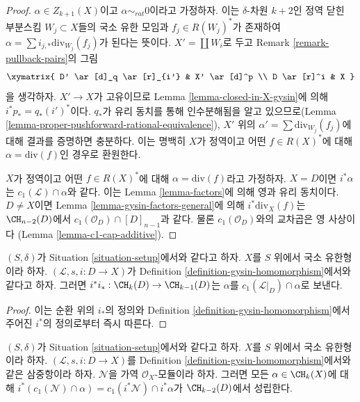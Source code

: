 \begin{proof}
$\alpha \in Z_{k + 1}(X)$이고 $\alpha \sim_{rat} 0$이라고 가정하자.
이는 $\delta$-차원 $k + 2$인 정역 닫힌 부분스킴
$W_j \subset X$들의 국소 유한 모임과 $f_j \in R(W_j)^*$가 존재하여
$\alpha = \sum i_{j, *}\text{div}_{W_j}(f_j)$가 된다는 뜻이다.
$X' = \coprod W_i$로 두고 Remark \ref{remark-pullback-pairs}의 그림
$$
\xymatrix{
D' \ar[d]_q \ar[r]_{i'} & X' \ar[d]^p \\
D \ar[r]^i & X
}
$$
을 생각하자. $X' \to X$가 고유이므로 Lemma
\ref{lemma-closed-in-X-gysin}에 의해 $i^*p_* = q_*(i')^*$이다.
$q_*$가 유리 동치를 통해 인수분해됨을 알고 있으므로(Lemma
\ref{lemma-proper-pushforward-rational-equivalence}), $X'$ 위의
$\alpha' = \sum \text{div}_{W_j}(f_j)$에 대해 결과를 증명하면 충분하다.
이는 명백히 $X$가 정역이고 어떤 $f \in R(X)^*$에 대해
$\alpha = \text{div}(f)$인 경우로 환원한다.

\medskip\noindent
$X$가 정역이고 어떤 $f \in R(X)^*$에 대해
$\alpha = \text{div}(f)$라고 가정하자. $X = D$이면
$i^*\alpha$는 $c_1(\mathcal{L}) \cap \alpha$와 같다.
이는 Lemma \ref{lemma-factors}에 의해 영과 유리 동치이다.
$D \not = X$이면 Lemma \ref{lemma-gysin-factors-general}에 의해
$i^*\text{div}_X(f)$는 $\CH_{n - 2}(D)$에서
$c_1(\mathcal{O}_D) \cap [D]_{n - 1}$과 같다. 물론
$c_1(\mathcal{O}_D)$와의 교차곱은 영 사상이다
(Lemma \ref{lemma-c1-cap-additive}).
\end{proof}

\begin{lemma}
\label{lemma-gysin-back}
$(S, \delta)$가 Situation \ref{situation-setup}에서와 같다고 하자. $X$를
$S$ 위에서 국소 유한형이라 하자. $(\mathcal{L}, s, i : D \to X)$가
Definition \ref{definition-gysin-homomorphism}에서와 같다고 하자. 그러면
$i^*i_* : \CH_k(D) \to \CH_{k - 1}(D)$는 $\alpha$를
$c_1(\mathcal{L}|_D) \cap \alpha$로 보낸다.
\end{lemma}

\begin{proof}
이는 순환 위의 $i_*$의 정의와 Definition
\ref{definition-gysin-homomorphism}에서 주어진 $i^*$의 정의로부터
즉시 따른다.
\end{proof}

\begin{lemma}
\label{lemma-gysin-commutes-cap-c1}
$(S, \delta)$가 Situation \ref{situation-setup}에서와 같다고 하자. $X$를
$S$ 위에서 국소 유한형이라 하자. $(\mathcal{L}, s, i : D \to X)$를
Definition \ref{definition-gysin-homomorphism}에서와 같은 삼중항이라
하자. $\mathcal{N}$을 가역 $\mathcal{O}_X$-모듈이라 하자. 그러면 모든
$\alpha \in \CH_k(X)$에 대해
$i^*(c_1(\mathcal{N}) \cap \alpha) = c_1(i^*\mathcal{N}) \cap i^*\alpha$가
$\CH_{k - 2}(D)$에서 성립한다.
\end{lemma}

